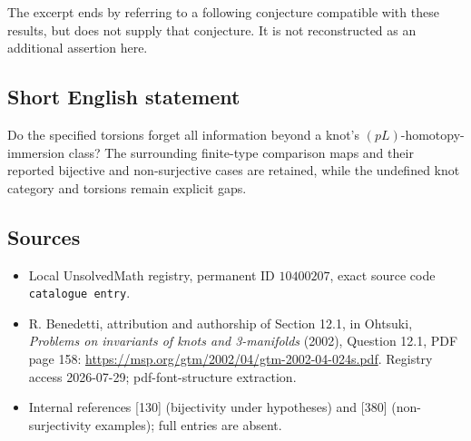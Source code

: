 \documentclass[11pt]{article}
\begin{document}
The excerpt ends by referring to a following conjecture compatible with these results, but does not supply that conjecture. It is not reconstructed as an additional assertion here.
\subsection{Short English statement}
Do the specified torsions forget all information beyond a knot's \((pL)\)-homotopy-immersion class? The surrounding finite-type comparison maps and their reported bijective and non-surjective cases are retained, while the undefined knot category and torsions remain explicit gaps.
\subsection{Sources}
\begin{itemize}
\item Local UnsolvedMath registry, permanent ID \(10400207\), exact source code \texttt{catalogue entry}.
\item R. Benedetti, attribution and authorship of Section 12.1, in Ohtsuki, \emph{Problems on invariants of knots and 3-manifolds} (2002), Question 12.1, PDF page 158: \url{https://msp.org/gtm/2002/04/gtm-2002-04-024s.pdf}. Registry access 2026-07-29; pdf-font-structure extraction.
\item Internal references [130] (bijectivity under hypotheses) and [380] (non-surjectivity examples); full entries are absent.
\end{itemize}
\end{document}
